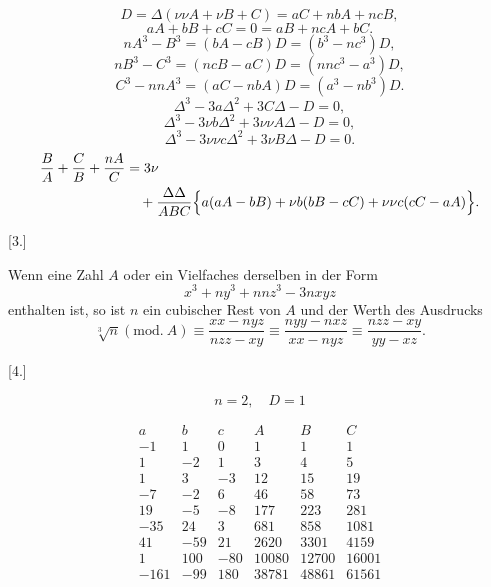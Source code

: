 \[
D = \Delta(\nu\nu A+\nu B+C) = aC+nbA+ncB,
\]
\[
aA+bB+cC = 0 = aB+ncA+bC.
\]
\[
nA^3-B^3 = (bA-cB)D = (b^3-nc^3)D,
\]
\[
nB^3-C^3 = (ncB-aC)D = (nnc^3-a^3)D,
\]
\[
C^3-nnA^3 = (aC-nbA)D = (a^3-nb^3)D.
\]
\[
\Delta^3-3a\Delta^2+3C\Delta-D = 0,
\]
\[
\Delta^3-3\nu b\Delta^2+3\nu\nu A\Delta-D = 0,
\]
\[
\Delta^3-3\nu\nu c\Delta^2+3\nu B\Delta-D = 0.
\]
\[
\begin{aligned}\frac{B}{A} + \frac{C}{B} + \frac{nA}{C} &= 3\nu\\ &\quad + \frac{\Delta\Delta}{ABC}
\Bigl\{a(aA-bB)+\nu b(bB-cC)+\nu\nu c(cC-aA)\Bigr\}.\end{aligned}
\]

\begin{center}[3.]\end{center}\par\noindent\hspace*{\parindent}Wenn eine Zahl $A$ oder ein Vielfaches derselben in der Form
\[
x^3+ny^3+nnz^3-3nxyz
\]
\noindent enthalten ist, so ist $n$ ein cubischer Rest von $A$ und der Werth des Ausdrucks
\[
\sqrt[3]{n} (\mathrm{mod.}\ A) \equiv \frac{xx-nyz}{nzz-xy} \equiv \frac{nyy-nxz}{xx-nyz} \equiv
\frac{nzz-xy}{yy-xz}.
\]

\begin{center}[4.]\end{center}

\[n=2,\quad D=1\]

\[
\begin{array}{ccc|ccc}
a & b & c & A & B & C \\
-1 & 1 & 0 & 1 & 1 & 1 \\
1 & -2 & 1 & 3 & 4 & 5 \\
1 & 3 & -3 & 12 & 15 & 19 \\
-7 & -2 & 6 & 46 & 58 & 73 \\
19 & -5 & -8 & 177 & 223 & 281 \\
-35 & 24 & 3 & 681 & 858 & 1081 \\
41 & -59 & 21 & 2620 & 3301 & 4159 \\
1 & 100 & -80 & 10080 & 12700 & 16001 \\
-161 & -99 & 180 & 38781 & 48861 & 61561 \\
\end{array}
\]
